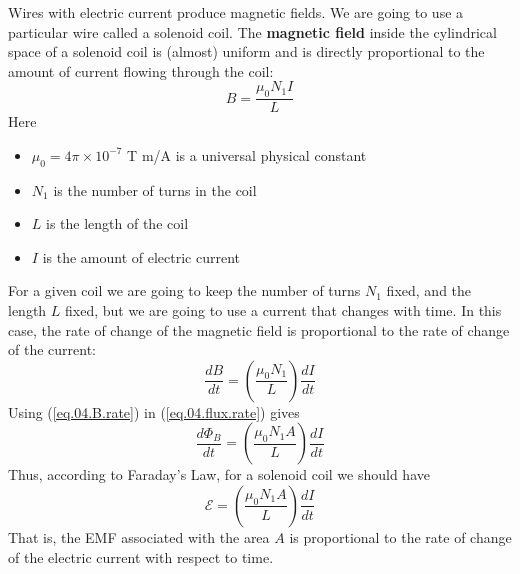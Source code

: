 Wires with electric current produce magnetic fields. We are going to use a particular wire called a solenoid coil. The \textbf{magnetic field} inside the cylindrical space of a solenoid coil is (almost) uniform and is directly proportional to the amount of current flowing through the coil:
\begin{equation}
	B = \frac{\mu_{0} N_{1} I}{L}
	\label{eq.04.B.coil}
\end{equation}
Here
\begin{itemize}
	\item $\mu_{0} = 4 \pi \times 10^{-7}$ T m/A  is a universal physical constant
	\item $N_{1}$ is the number of turns in the coil
	\item $L$ is the length of the coil
	\item $I$ is the amount of electric current
\end{itemize}
For a given coil we are going to keep the number of turns $N_{1}$ fixed, and the length $L$ fixed, but we are going to use a current that changes with time. In this case, the rate of change of the magnetic field is proportional to the rate of change of the current:
\begin{equation}
	\frac{d B}{d t} = \left( \frac{\mu_{0} N_{1}}{L} \right) \frac{d I}{d t}
	\label{eq.04.B.rate}
\end{equation}
Using (\ref{eq.04.B.rate}) in (\ref{eq.04.flux.rate}) gives
\begin{equation}
	\frac{d \Phi_{B}}{d t} = \left( \frac{\mu_{0} N_{1} A}{L} \right) \frac{d I}{d t}
\end{equation}
Thus, according to Faraday's Law, for a solenoid coil we should have
\begin{equation}
	\mathcal{E} = \left( \frac{\mu_{0} N_{1} A}{L} \right) \frac{d I}{d t}
	\label{eq.04.emf.solenoid}
\end{equation}
That is, the EMF associated with the area $A$ is proportional to the rate of change of the electric current with respect to time.
